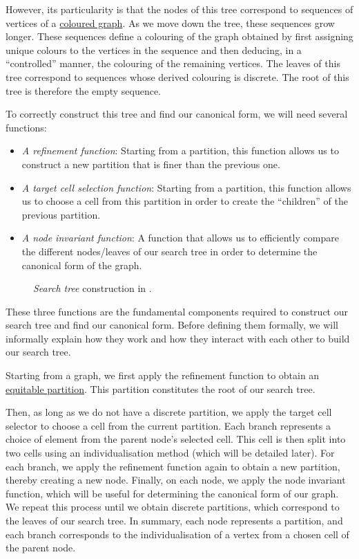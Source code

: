 However, its particularity is that the nodes of this tree correspond to sequences of vertices of a \hyperref[def: colouring]{coloured graph}. As we move down the tree, these sequences grow longer. These sequences define a colouring of the graph obtained by first assigning unique colours to the vertices in the sequence and then deducing, in a ``controlled'' manner, the colouring of the remaining vertices. The leaves of this tree correspond to sequences whose derived colouring is discrete. The root of this tree is therefore the empty sequence. 

To correctly construct this tree and find our canonical form, we will need several functions:

\begin{itemize}

  \item \textit{A refinement function}: Starting from a  partition, this function allows us to construct a new partition that is finer than the previous one.
  
  \item \textit{A target cell selection function}: Starting from a partition, this function allows us to choose a cell from this partition in order to create the ``children'' of the previous partition. 
  
  \item \textit{A node invariant function}: A function that allows us to efficiently compare the different nodes/leaves of our search tree in order to determine the canonical form of the graph.
  
\end{itemize}

\begin{figure}[ht]
  \centering
  
  \caption{\textit{Search tree} construction in \Naut{}.}\label{fig:search-tree}
\end{figure}

These three functions are the fundamental components required to construct our search tree and find our canonical form. Before defining them formally, we will informally explain how they work and how they interact with each other to build our search tree.

Starting from a graph, we first apply the refinement function to obtain an \hyperref[def: colouring]{equitable partition}. This partition constitutes the root of our search tree.

Then, as long as we do not have a discrete partition, we apply the target cell selector to choose a cell from the current partition. Each branch represents a choice of element from the parent node's selected cell. This cell is then split into two cells using an individualisation method (which will be detailed later). For each branch, we apply the refinement function again to obtain a new partition, thereby creating a new node. Finally, on each node, we apply the node invariant function, which will be useful for determining the canonical form of our graph. We repeat this process until we obtain discrete partitions, which correspond to the leaves of our search tree. In summary, each node represents a partition, and each branch corresponds to the individualisation of a vertex from a chosen cell of the parent node.


